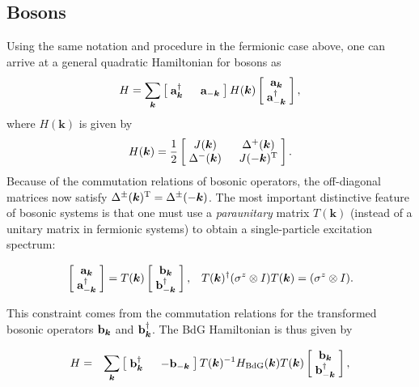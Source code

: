 \documentclass{tADP2e}
\theoremstyle{plain}
\newcommand{\eqn}[1]{
\begin{eqnarray}
	#1
\end{eqnarray}
}
\theoremstyle{plain}
\theoremstyle{definition}
\begin{document}
\begin{appendices}
\subsection*{Bosons}
Using the same notation and procedure in the fermionic case above, one can arrive at a general quadratic Hamiltonian for bosons as
\begin{equation}
H=\sum_{\boldsymbol{k}} \begin{bmatrix} \;\bold{a}_{\boldsymbol{k}}^\dag\; & \;\bold{a}_{-\boldsymbol{k}}\; \end{bmatrix} H(\boldsymbol{k})\begin{bmatrix} \;\bold{a}_{\boldsymbol{k}}\; \\ \;\bold{a}^\dag_{-\boldsymbol{k}}\; \end{bmatrix},
\end{equation}
where $H(\boldsymbol{k})$ is given by
\begin{equation}
H(\boldsymbol{k})=\frac{1}{2}\begin{bmatrix} \;J(\boldsymbol{k})\; & \;\Delta^+(\boldsymbol{k})\; \\ \;\Delta^-(\boldsymbol{k})\; & \;J(-\boldsymbol{k})^{\rm T}\;  \end{bmatrix}.
\end{equation}
Because of the commutation relations of bosonic operators, the off-diagonal matrices now satisfy $\Delta^{\pm}({\boldsymbol k})^{\rm T}=\Delta^{\pm}(-\boldsymbol{k})$. The most important distinctive feature of bosonic systems is that one must use a \emph{paraunitary} matrix $T({\boldsymbol k})$ \cite{JHPC78,MR13} (instead of a unitary matrix in fermionic systems) to obtain a single-particle excitation spectrum:
\eqn{
\begin{bmatrix} \;\bold{a}_{\boldsymbol{k}}\; \\ \;\bold{a}^\dag_{-\boldsymbol{k}}\; \end{bmatrix}=T({\boldsymbol k})\begin{bmatrix} \;\bold{b}_{\boldsymbol{k}}\; \\ \;\bold{b}^\dag_{-\boldsymbol{k}}\; \end{bmatrix},\;\;\;T({\boldsymbol k})^\dag(\sigma^z\otimes I)T({\boldsymbol k})=(\sigma^z\otimes I).
}
This constraint comes from the commutation relations for the transformed bosonic operators $\bold{b}_{\boldsymbol{k}}$ and $\bold{b}_{\boldsymbol{k}}^\dagger$. 
The BdG Hamiltonian is thus given by
\eqn{
H&=&\sum_{\boldsymbol{k}} \begin{bmatrix} \;\bold{b}_{\boldsymbol{k}}^\dag\; & \;-\bold{b}_{-\boldsymbol{k}}\; \end{bmatrix} T({\boldsymbol k})^{-1}H_{\rm BdG}(\boldsymbol{k})T({\boldsymbol k})\begin{bmatrix} \;\bold{b}_{\boldsymbol{k}}\; \\ \;\bold{b}^\dag_{-\boldsymbol{k}}\; \end{bmatrix},\\
}
\end{appendices}
\end{document}
